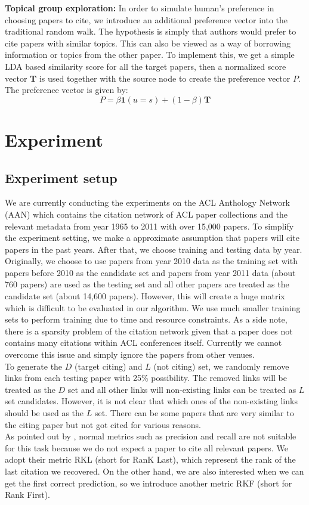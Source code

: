 \documentclass{article} %
\begin{document}
\textbf{Topical group exploration:} In order to simulate human's preference in choosing papers to cite, we introduce an additional preference vector into the traditional random walk. The hypothesis is simply that authors would prefer to cite papers with similar topics. This can also be viewed as a way of borrowing information or topics from the other paper. To implement this, we get a simple LDA based similarity score for all the target papers, then a normalized score vector $\textbf{T}$ is used together with the source node to create the preference vector $P$. The preference vector is given by:
\begin{equation}
P =\beta \textbf{1}(u=s) + (1-\beta)\textbf{T}
\end{equation}
\section{Experiment} 
\subsection{Experiment setup}
We are currently conducting the experiments on the ACL Anthology Network (AAN) \cite{Radev&al.09,Radev&al.09a} which contains the citation network of ACL paper collections and the relevant metadata from year 1965 to 2011 with over 15,000 papers. To simplify the experiment setting, we make a approximate assumption that papers will cite papers in the past years. After that, we choose training and testing data by year. Originally, we choose to use papers from year 2010 data as the training set with papers before 2010 as the candidate set and papers from year 2011 data (about 760 papers) are used as the testing set and all other papers are treated as the candidate set (about 14,600 papers). However, this will create a huge matrix which is difficult to be evaluated in our algorithm. We use much smaller training sets to perform training due to time and resource constraints. As a side note, there is a sparsity problem of the citation network given that a paper does not contains many citations within ACL conferences itself. Currently we cannot overcome this issue and simply ignore the papers from other venues.\\
  To generate the $D$ (target citing) and $L$ (not citing) set, we randomly remove links from each testing paper with 25\% possibility. The removed links will be treated as the $D$ set and all other links will non-existing links can be treated as $L$ set candidates. However, it is not clear that which ones of the non-existing links should be used as the $L$ set. There can be some papers that are very similar to the citing paper but not got cited for various reasons.\\
As pointed out by \cite{nallapati2008joint}, normal metrics such as precision and recall are not suitable for this task because we do not expect a paper to cite all relevant papers. We adopt their metric RKL (short for RanK Last), which represent the rank of the last citation we recovered. On the other hand, we are also interested when we can get the first correct prediction, so we introduce another metric RKF (short for Rank First).\\
\end{document}
